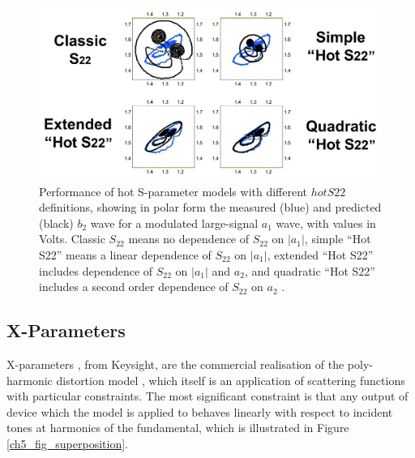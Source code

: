 \documentclass[../thesis/thesis.tex]{subfiles}
\begin{document}
\begin{figure}
	\centering
	\includegraphics[width=\linewidth]{hots22_recoloured}
	\caption[Performance of hot S-parameter models with different $hotS22$ definitions.]{Performance of hot S-parameter models with different $hotS22$ definitions, showing in polar form the measured (blue) and predicted (black) $b_2$ wave for a modulated large-signal $a_1$ wave, with values in Volts. Classic $S_{22}$ means no dependence of $S_{22}$ on $|a_1|$, simple ``Hot S22'' means a linear dependence of $S_{22}$ on $|a_1|$, extended ``Hot S22'' includes dependence of $S_{22}$ on $|a_1|$ and $a_2$, and quadratic ``Hot S22'' includes a second order dependence of $S_{22}$ on $a_2$ \cite{Verspecht_2002}.}
	\label{ch5_fig_hots22}
\end{figure}

\subsection{X-Parameters}

X-parameters \cite{Root_2013}, from Keysight, are the commercial realisation of the poly-harmonic distortion model \cite{Verspecht_2006}, which itself is an application of scattering functions with particular constraints. The most significant constraint is that any output of device which the model is applied to behaves linearly with respect to incident tones at harmonics of the fundamental, which is illustrated in Figure \ref{ch5_fig_superposition}. 
\end{document}
